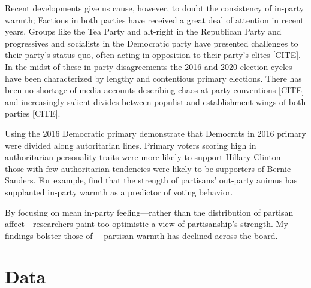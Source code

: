 \documentclass[12pt]{paper}
\begin{document}
Recent developments give us cause, however, to doubt the consistency of in-party warmth; Factions in both parties have received a great deal of attention in recent years. Groups like the Tea Party and alt-right in the Republican Party and progressives and socialists in the Democratic party have presented challenges to their party's status-quo, often acting in opposition to their party's elites [CITE]. In the midst of these in-party disagreements the 2016 and 2020 election cycles have been characterized by lengthy and contentious primary elections. There has been no shortage of media accounts describing chaos at party conventions [CITE] and increasingly salient divides between populist and establishment wings of both parties [CITE]. 

Using the 2016 Democratic primary \cite{wronski2018tale} demonstrate that Democrats in 2016 primary were divided along autoritarian lines. Primary voters scoring high in authoritarian personality traits were more likely to support Hillary Clinton---those with few authoritarian tendencies were likely to be supporters of Bernie Sanders. For example, \cite{iyengar2018strengthening} find that the strength of partisans' out-party animus has supplanted in-party warmth as a predictor of voting behavior. 



By focusing on mean in-party feeling---rather than the distribution of partisan affect---researchers paint too optimistic a view of partisanship's strength. My findings bolster those of  \cite{klar2018affective}---partisan warmth has declined across the board.




\section{Data}
\end{document}
